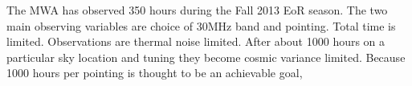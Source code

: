 The MWA has observed 350 hours during the Fall 2013 EoR season.  The two main observing variables are choice of 30MHz band and pointing. Total time is limited. Observations are thermal noise limited. After about 1000 hours on a particular sky location and tuning they become cosmic variance limited.   Because 1000 hours per pointing is thought to be an achievable goal, 